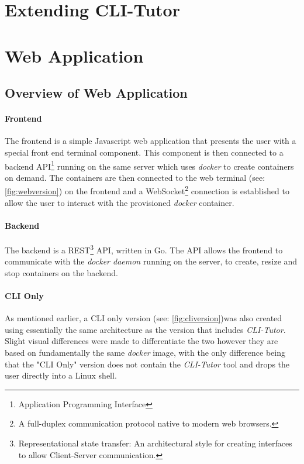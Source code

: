 \section{Extending CLI-Tutor}


\section{Web Application}
\subsection{Overview of Web Application}


\paragraph{Frontend} The frontend is a simple Javascript web application that
presents the user with a special front end terminal component. This component
is then connected to a backend API\footnote{Application Programming Interface}
running on the same server which uses \textit{docker} to create containers on
demand. The containers are then connected to the web terminal (see: \autoref{fig:webversion}) on the frontend
and a WebSocket\footnote{A full-duplex communication protocol native to modern
web browsers.} connection is established to allow the user to interact
with the provisioned \textit{docker} container.

\paragraph{Backend} The backend is a REST\footnote{Representational state
transfer: An architectural style for creating interfaces to allow Client-Server
communication.} API, written in Go. The API allows the frontend to communicate
with the \textit{docker daemon} running on the server, to create,
resize and stop containers on the backend.
 
\paragraph{CLI Only} As mentioned earlier, a CLI only version (see: \autoref{fig:cliversion})was also created
using essentially the same architecture as the version that includes
\textit{CLI-Tutor}. Slight visual differences were made to differentiate the
two however they are based on fundamentally the same \textit{docker} image, with
the only difference being that the "CLI Only" version does not contain the
\textit{CLI-Tutor} tool and drops the user directly into a Linux shell.

